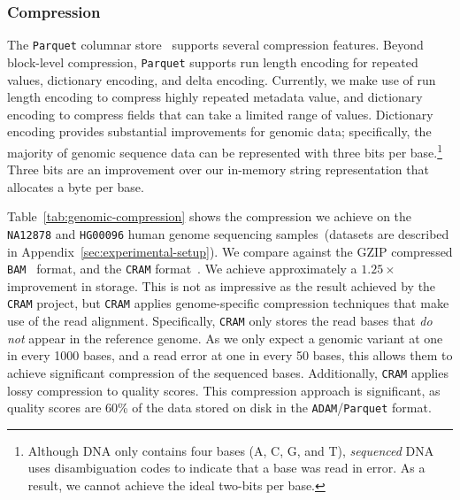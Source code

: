 \documentclass{acm_proc_article-sp}
\begin{document}
\subsubsection{Compression}
\label{sec:compression}

The \texttt{Parquet} columnar store~\cite{parquet} supports several compression features. Beyond block-level
compression, \texttt{Parquet} supports run length encoding for repeated values, dictionary encoding, and delta
encoding. Currently, we make use of run length encoding to compress highly repeated metadata value,
and dictionary encoding to compress fields that can take a limited range of values. Dictionary encoding provides
substantial improvements for genomic data; specifically, the majority of genomic sequence data can be
represented with three bits per base.\footnote{Although DNA only contains four bases (A, C, G, and T),
\emph{sequenced} DNA uses disambiguation codes to indicate that a base was read in error. As a result, we
cannot achieve the ideal two-bits per base.} Three bits are an improvement over our in-memory string representation
that allocates a byte per base.

Table~\ref{tab:genomic-compression} shows the compression we achieve on the \texttt{NA12878}
and \texttt{HG00096} human genome sequencing samples~(datasets are described in
Appendix~\ref{sec:experimental-setup}). We compare against the GZIP compressed \texttt{BAM}~\cite{li09} format, and
the \texttt{CRAM} format~\cite{fritz11}. We achieve approximately a $1.25\times$ improvement in storage. This is not as
impressive as the result achieved by the \texttt{CRAM} project, but \texttt{CRAM} applies genome-specific compression
techniques that make use of the read alignment. Specifically, \texttt{CRAM} only stores the read bases that \emph{do
not} appear in the reference genome. As we only expect a genomic variant at one in every 1000 bases, and a read error 
at one in every 50 bases, this allows them to achieve significant compression of the sequenced bases. Additionally,
\texttt{CRAM} applies lossy compression to quality scores. This compression approach is significant, as quality scores
are 60\% of the data stored on disk in the \texttt{ADAM}/\texttt{Parquet} format.
\end{document}
